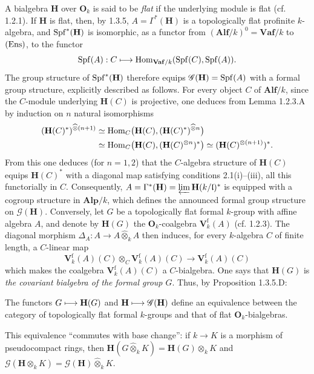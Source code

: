 A bialgebra $\mathbf H$ over $\mathbf O_k$ is said to be \emph{flat} if the underlying module is flat (cf. 1.2.1). If $\mathbf H$ is flat, then, by 1.3.5, $A=\Gamma^*(\mathbf H)$ is a topologically flat profinite $k$-algebra, and $\operatorname{Spf}^*(\mathbf H)$ is isomorphic, as a functor from $(\mathbf{Alf}/k)^0=\mathbf{Vaf}/k$ to $\textup{(Ens)}$, to the functor
\[
\operatorname{Spf}(A):C\longmapsto\operatorname{Hom}_{\mathbf{Vaf}/k}(\operatorname{Spf}(C),\operatorname{Spf}(A)).
\]
The group structure of $\operatorname{Spf}^*(\mathbf H)$ therefore equips $\mathscr G(\mathbf H)=\operatorname{Spf}(A)$ with a formal group structure, explicitly described as follows.
For every object $C$ of $\mathbf{Alf}/k$, since the $C$-module underlying $\mathbf H(C)$ is projective, one deduces from Lemma 1.2.3.A by induction on $n$ natural isomorphisms
\[
\begin{aligned}
(\mathbf H(C)^*)^{\widehat\otimes(n+1)}&\simeq\operatorname{Hom}_C\bigl(\mathbf H(C),(\mathbf H(C)^*)^{\widehat\otimes n}\bigr)\\
&\simeq\operatorname{Hom}_C\bigl(\mathbf H(C),(\mathbf H(C)^{\otimes n})^*\bigr)
\simeq(\mathbf H(C)^{\otimes(n+1)})^*.
\end{aligned}
\]
From this one deduces (for $n=1,2$) that the $C$-algebra structure of $\mathbf H(C)$ equips $\mathbf H(C)^*$ with a diagonal map satisfying conditions 2.1(i)--(iii), all this functorially in $C$.
Consequently, $A=\Gamma^*(\mathbf H)=\varprojlim\mathbf H(k/\mathfrak l)^*$ is equipped with a cogroup structure in $\mathbf{Alp}/k$, which defines the announced formal group structure on $\mathscr G(\mathbf H)$.
Conversely, let $G$ be a topologically flat formal $k$-group with affine algebra $A$, and denote by $\mathbf H(G)$ the $\mathbf O_k$-coalgebra $\mathbf V_k^{\mathrm f}(A)$ (cf. 1.2.3). The diagonal morphism $\Delta_A:A\to A\widehat\otimes_k A$ then induces, for every $k$-algebra $C$ of finite length, a $C$-linear map
\[
\mathbf V_k^{\mathrm f}(A)(C)\otimes_C\mathbf V_k^{\mathrm f}(A)(C)\to\mathbf V_k^{\mathrm f}(A)(C)
\]
which makes the coalgebra $\mathbf V_k^{\mathrm f}(A)(C)$ a $C$-bialgebra. One says that $\mathbf H(G)$ is \emph{the covariant bialgebra of the formal group $G$}. Thus, by Proposition 1.3.5.D:
\begin{proposition}{}
\begin{enumeratei}
\item The functors $G\longmapsto\mathbf H(G)$ and $\mathbf H\longmapsto\mathscr G(\mathbf H)$ define an equivalence between the category of topologically flat formal $k$-groups and that of flat $\mathbf O_k$-bialgebras.
\item This equivalence ``commutes with base change'': if $k\to K$ is a morphism of pseudocompact rings, then $\mathbf H(G\widehat\otimes_k K)=\mathbf H(G)\otimes_k K$ and $\mathscr G(\mathbf H\otimes_k K)=\mathscr G(\mathbf H)\widehat\otimes_k K$.
\end{enumeratei}
\end{proposition}
